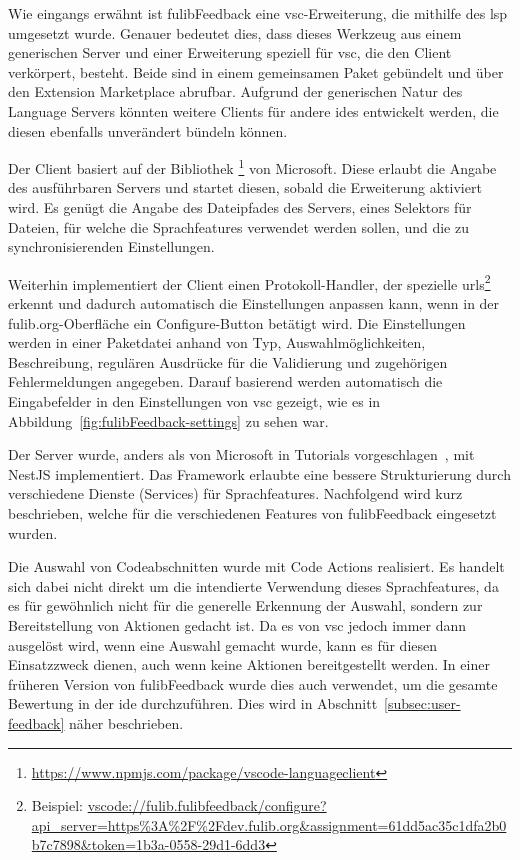 Wie eingangs erwähnt ist fulibFeedback eine \ac{vsc}-Erweiterung, die mithilfe des \ac{lsp} umgesetzt wurde.
Genauer bedeutet dies, dass dieses Werkzeug aus einem generischen Server und einer Erweiterung speziell für \ac{vsc}, die den Client verkörpert, besteht.
Beide sind in einem gemeinsamen Paket gebündelt und über den Extension Marketplace abrufbar.
Aufgrund der generischen Natur des Language Servers könnten weitere Clients für andere \acp{ide} entwickelt werden, die diesen ebenfalls unverändert bündeln können.

Der Client basiert auf der Bibliothek \footnote{
    \url{https://www.npmjs.com/package/vscode-languageclient}
} von Microsoft.
Diese erlaubt die Angabe des ausführbaren Servers und startet diesen, sobald die Erweiterung aktiviert wird.
Es genügt die Angabe des Dateipfades des Servers, eines Selektors für Dateien, für welche die Sprachfeatures verwendet werden sollen, und die zu synchronisierenden Einstellungen.

Weiterhin implementiert der Client einen Protokoll-Handler, der spezielle \acp{url}\footnote{
    Beispiel: \url{vscode://fulib.fulibfeedback/configure?api_server=https\%3A\%2F\%2Fdev.fulib.org&assignment=61dd5ac35c1dfa2b0b7c7898&token=1b3a-0558-29d1-6dd3}
} erkennt und dadurch automatisch die Einstellungen anpassen kann, wenn in der fulib.org-Oberfläche ein Configure-Button betätigt wird.
Die Einstellungen werden in einer Paketdatei anhand von Typ, Auswahlmöglichkeiten, Beschreibung, regulären Ausdrücke für die Validierung und zugehörigen Fehlermeldungen angegeben.
Darauf basierend werden automatisch die Eingabefelder in den Einstellungen von \ac{vsc} gezeigt, wie es in Abbildung~\ref{fig:fulibFeedback-settings} zu sehen war.

Der Server wurde, anders als von Microsoft in Tutorials vorgeschlagen~\cite{vsc-language-server-guide}, mit NestJS implementiert.
Das Framework erlaubte eine bessere Strukturierung durch verschiedene Dienste (Services) für Sprachfeatures.
Nachfolgend wird kurz beschrieben, welche für die verschiedenen Features von fulibFeedback eingesetzt wurden.

Die Auswahl von Codeabschnitten wurde mit Code Actions realisiert.
Es handelt sich dabei nicht direkt um die intendierte Verwendung dieses Sprachfeatures, da es für gewöhnlich nicht für die generelle Erkennung der Auswahl, sondern zur Bereitstellung von Aktionen gedacht ist.
Da es von \ac{vsc} jedoch immer dann ausgelöst wird, wenn eine Auswahl gemacht wurde, kann es für diesen Einsatzzweck dienen, auch wenn keine Aktionen bereitgestellt werden.
In einer früheren Version von fulibFeedback wurde dies auch verwendet, um die gesamte Bewertung in der \ac{ide} durchzuführen.
Dies wird in Abschnitt~\ref{subsec:user-feedback} näher beschrieben.

